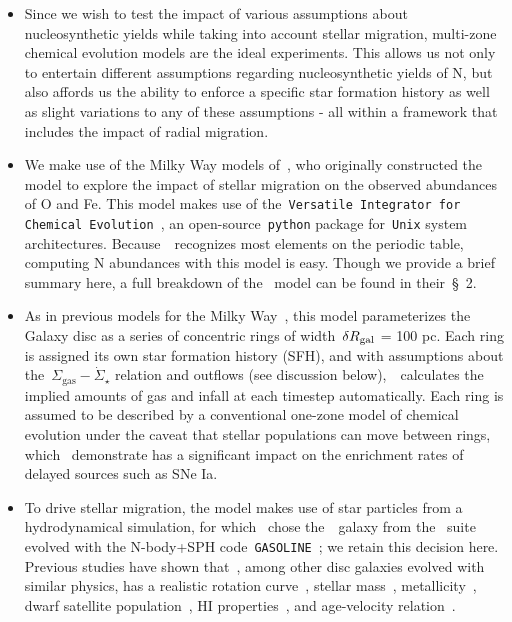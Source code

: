 \documentclass[ms.tex]{subfiles}
\begin{document}
\begin{itemize} 
	\item Since we wish to test the impact of various assumptions about 
	nucleosynthetic yields while taking into account stellar migration, 
	multi-zone chemical evolution models are the ideal experiments. 
	This allows us not only to entertain different assumptions regarding 
	nucleosynthetic yields of N, but also affords us the ability to enforce a 
	specific star formation history as well as slight variations to any of 
	these assumptions - all within a framework that includes the impact of 
	radial migration. 

	\item We make use of the Milky Way models of~\citet{Johnson2021}, who 
	originally constructed the model to explore the impact of stellar migration 
	on the observed abundances of O and Fe. 
	This model makes use of the~\texttt{Versatile Integrator for Chemical 
	Evolution}~\citep[\vice;][]{Johnson2020, Griffith2021, Johnson2021}, an 
	open-source~\texttt{python} package for~\texttt{Unix} system architectures. 
	Because~\vice~recognizes most elements on the periodic table, computing 
	N abundances with this model is easy. 
	Though we provide a brief summary here, a full breakdown of 
	the~\citet{Johnson2021} model can be found in their~\S~2. 

	\item As in previous models for the Milky Way~\citep[e.g.][]{Matteucci1989, 
	Schoenrich2009, Minchev2013, Minchev2014, Minchev2017, Sharma2020}, this 
	model parameterizes the Galaxy disc as a series of concentric rings of 
	width~$\delta R_\text{gal}$ = 100 pc.
	Each ring is assigned its own star formation history (SFH), and with 
	assumptions about the~$\Sigma_\text{gas}-\dot{\Sigma}_\star$ relation and 
	outflows (see discussion below),~\vice~calculates the implied amounts of 
	gas and infall at each timestep automatically. 
	Each ring is assumed to be described by a conventional one-zone model of 
	chemical evolution under the caveat that stellar populations can move 
	between rings, which~\citet{Johnson2021} demonstrate has a significant 
	impact on the enrichment rates of delayed sources such as SNe Ia. 

	\item To drive stellar migration, the model makes use of star particles 
	from a hydrodynamical simulation, for which~\citet{Johnson2021} chose 
	the~\hsim~galaxy from the~\citet{Christensen2012} suite evolved with the 
	N-body+SPH code~\texttt{GASOLINE}~\citep{Wadsley2004}; we retain this 
	decision here. 
	Previous studies have shown that~\hsim, among other disc galaxies evolved 
	with similar physics, has a realistic rotation curve~\citep{Governato2012, 
	Christensen2014a, Christensen2014b}, stellar mass~\citep{Munshi2013}, 
	metallicity~\citep{Christensen2016}, dwarf satellite 
	population~\citep{Zolotov2012,Brooks2014}, HI properties~\citep{Brooks2017}, 
	and age-velocity relation~\citep{Bird2021}. 


\end{itemize}
\end{document}
